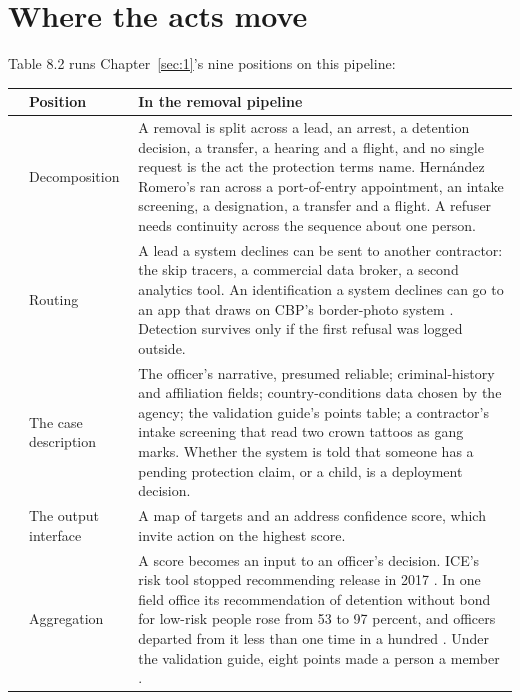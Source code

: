 \section{Where the acts move}
\label{sec:8.3}
Table 8.2 runs Chapter~\ref{sec:1}'s nine positions on this pipeline:


\begingroup\small\renewcommand{\arraystretch}{1.12}
\begin{longtable}{@{}>{\raggedright\arraybackslash}p{}>{\raggedright\arraybackslash}p{}>{\raggedright\arraybackslash}p{}@{}}
\hline
 & \textbf{Position} & \textbf{In the removal pipeline} \\
\hline
\endhead
1 & Decomposition & A removal is split across a lead, an arrest, a detention decision, a transfer, a hearing and a flight, and no single request is the act the protection terms name. Hernández Romero's ran across a port-of-entry appointment, an intake screening, a designation, a transfer and a flight. A refuser needs continuity across the sequence about one person. \\ \hline
2 & Routing & A lead a system declines can be sent to another contractor: the skip tracers, a commercial data broker, a second analytics tool. An identification a system declines can go to an app that draws on CBP's border-photo system \autocite{Cox2025MobileFortify}. Detection survives only if the first refusal was logged outside. \\ \hline
3 & The case description & The officer's narrative, presumed reliable; criminal-history and affiliation fields; country-conditions data chosen by the agency; the validation guide's points table; a contractor's intake screening that read two crown tattoos as gang marks. Whether the system is told that someone has a pending protection claim, or a child, is a deployment decision. \\ \hline
4 & The output interface & A map of targets and an address confidence score, which invite action on the highest score. \\ \hline
5 & Aggregation & A score becomes an input to an officer's decision. ICE's risk tool stopped recommending release in 2017 \autocite{Tashea2018RCA,nyclu2018rca}. In one field office its recommendation of detention without bond for low-risk people rose from 53 to 97 percent, and officers departed from it less than one time in a hundred \autocite{Biddle2020RCA}. Under the validation guide, eight points made a person a member \autocite{MartinezBeltran2025Validation}. \\ \hline

\end{longtable}
